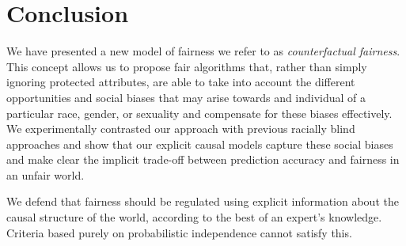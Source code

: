 \documentclass{article}
\begin{document}
\section{Conclusion}
\label{sec:conclusion}
We have presented a new model of fairness we refer to as {\em
  counterfactual fairness}. This concept allows us to propose fair
algorithms that, rather than simply ignoring protected attributes, are
able to take into account the different opportunities and social biases
that may arise towards and individual of a particular race, gender, or
sexuality and compensate for these biases effectively. We
experimentally contrasted our approach with previous racially blind
approaches and show that our explicit causal models capture these
social biases and make clear the implicit trade-off between
prediction accuracy and fairness in an unfair world.

We defend that fairness should be regulated using explicit
information about the causal structure of the world, according to the
best of an expert's knowledge. Criteria based purely on probabilistic
independence cannot satisfy this.



\end{document}

